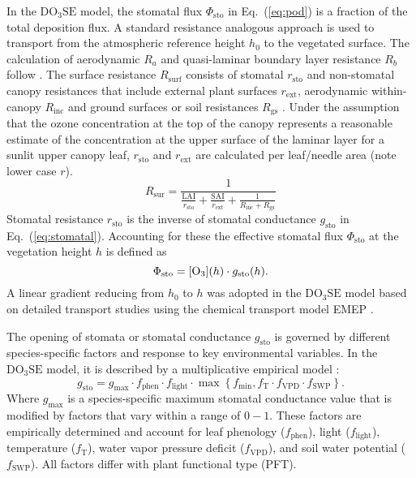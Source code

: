 \documentclass[bg, manuscript]{copernicus}
\begin{document}
In the $\mathrm{DO_3SE}$ model, the stomatal flux $\Phi_\mathrm{sto}$ in Eq.~(\ref{eq:pod}) is a fraction of the total  deposition flux. A standard resistance analogous approach \citep{AE:Wesely1989} is used to transport  from the atmospheric reference height $h_0$ to the vegetated surface. The calculation of aerodynamic $R_a$ and quasi-laminar boundary layer resistance $R_b$ follow \citet{WASP:Simpson2003,ACP:Simpson2012}. The surface resistance $R_\mathrm{surf}$ consists of stomatal $r_\mathrm{sto}$ and non-stomatal canopy resistances that include external plant surfaces $r_\mathrm{ext}$, aerodynamic within-canopy $R_\mathrm{inc}$ and ground surfaces or soil resistances $R_\mathrm{gs}$ \citep{WASP:Simpson2003,ACP:Simpson2012}. Under the assumption that the ozone concentration \chem{[O_3]} at the top of the canopy represents a reasonable estimate of the concentration at the upper surface of the laminar layer for a sunlit upper canopy leaf, $r_\mathrm{sto}$ and $r_\mathrm{ext}$ are calculated per leaf/needle area (note lower case $r$).
%
\begin{equation}
  R_\mathrm{sur} = \frac{1}{\frac{\mathrm{LAI}}{r_\mathrm{sto}}+\frac{\mathrm{SAI}}{r_\mathrm{ext}}+\frac{1}{R_\mathrm{inc}+R_\mathrm{gs}}}
\end{equation}
%
Stomatal resistance $r_\mathrm{sto}$ is the inverse of stomatal conductance $g_\mathrm{sto}$ in Eq.~(\ref{eq:stomatal}). Accounting for these the effective stomatal flux $\Phi_\mathrm{sto}$ at the vegetation height $h$ is defined as
%
\begin{equation}
  \Phi_\mathrm{sto} = \chem{[O_3]}(h) \cdot g_\mathrm{sto}(h).
  \label{eq:flux_stomata}
\end{equation}
A linear gradient reducing \chem{[O_3]} from $h_0$ to $h$ was adopted in the $\mathrm{DO_3SE}$ model based on detailed transport studies using the chemical transport model EMEP \citep{ACP:Simpson2012,ICP:MappingManual2017}.

The opening of stomata or stomatal conductance $g_\mathrm{sto}$ is governed by different species-specific factors and response to key environmental variables. In the $\mathrm{DO_3SE}$ model, it is described by a multiplicative empirical model \citep{PTRS:Jarvis1976,Emberson2000,ICP:MappingManual2017}:
\begin{equation}
  g_\text{sto} = g_\text{max} \cdot f_\text{phen} \cdot f_\text{light} \cdot \max{\left\{f_\text{min}, f_\mathrm{T} \cdot f_\mathrm{VPD} \cdot f_\text{SWP}\right\}}.
  \label{eq:stomatal}
\end{equation}
%
Where $g_\mathrm{max}$ is a species-specific maximum stomatal conductance value that is modified by factors that vary within a range of $0-1$. These factors are empirically determined and account for leaf phenology ($f_\text{phen}$), light ($f_\text{light}$), temperature ($f_\mathrm{T}$), water vapor pressure deficit ($f_\mathrm{VPD}$), and soil water potential ($f_\text{SWP}$). All factors differ with plant functional type (PFT).
\end{document}
